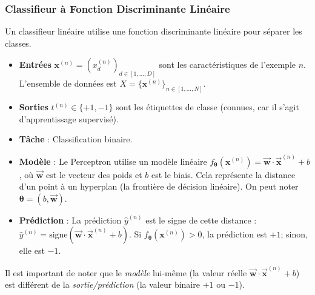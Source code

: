 \documentclass{article}
\begin{document}
\subsubsection{Classifieur à Fonction Discriminante Linéaire}
Un classifieur linéaire utilise une fonction discriminante linéaire pour séparer les classes.
\begin{itemize}
    \item \textbf{Entrées} $\mathbf{x}^{(n)} = (x_d^{(n)})_{d \in [1, \dots, D]}$ sont les caractéristiques de l'exemple $n$. L'ensemble de données est $X = \{\mathbf{x}^{(n)}\}_{n \in [1, \dots, N]}$.
    \item \textbf{Sorties} $t^{(n)} \in \{+1, -1\}$ sont les étiquettes de classe (connues, car il s'agit d'apprentissage supervisé).
    \item \textbf{Tâche} : Classification binaire.
    \item \textbf{Modèle} : Le Perceptron utilise un modèle linéaire $f_\mathbf{\theta}(\mathbf{x}^{(n)}) = \mathbf{\vec{w}} \cdot \mathbf{\vec{x}}^{(n)} + b$, où $\mathbf{\vec{w}}$ est le vecteur des poids et $b$ est le biais. Cela représente la distance d'un point à un hyperplan (la frontière de décision linéaire). On peut noter $\mathbf{\theta} = (b, \mathbf{\vec{w}})$.
    \item \textbf{Prédiction} : La prédiction $\hat{y}^{(n)}$ est le signe de cette distance : $\hat{y}^{(n)} = \text{signe}(\mathbf{\vec{w}} \cdot \mathbf{\vec{x}}^{(n)} + b)$. Si $f_\mathbf{\theta}(\mathbf{x}^{(n)}) > 0$, la prédiction est $+1$; sinon, elle est $-1$.
\end{itemize}
Il est important de noter que le \textit{modèle} lui-même (la valeur réelle $\mathbf{\vec{w}} \cdot \mathbf{\vec{x}}^{(n)} + b$) est différent de la \textit{sortie/prédiction} (la valeur binaire $+1$ ou $-1$).
\end{document}
